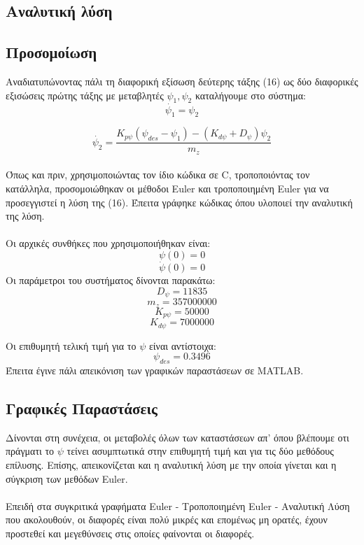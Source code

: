 \documentclass{article}
\begin{document}
\subsection{Αναλυτική λύση}
\subsection{Προσομοίωση}
Αναδιατυπώνοντας πάλι τη διαφορική εξίσωση δεύτερης τάξης (16) ως δύο διαφορικές εξισώσεις πρώτης τάξης με μεταβλητές \(\psi_1, \psi_2\) καταλήγουμε στο σύστημα:
\begin{equation}
\dot{\psi_1} = \psi_2
\end{equation}

\begin{equation}
\dot{\psi_2} = \frac{K_{p\psi}(\psi_{des} - \psi_1) - (K_{d\psi} + D_\psi)\psi_2}{m_z}
\end{equation}
\\
Όπως και πριν, χρησιμοποιώντας τον ίδιο κώδικα σε C, τροποποιόντας τον κατάλληλα, προσομοιώθηκαν οι μέθοδοι Euler και τροποποιημένη Euler για να προσεγγιστεί η λύση της (16). Έπειτα γράφηκε κώδικας όπου υλοποιεί την αναλυτική της λύση.   
\\\\Oι αρχικές συνθήκες που χρησιμοποιήθηκαν είναι:
\[\psi(0) = 0\]
\[\dot{\psi}(0) = 0\]
Οι παράμετροι του συστήματος δίνονται παρακάτω:
\[D_\psi = 11835\]
\[m_z = 357000000\]
\[K_{p\psi} = 50000\]
\[K_{d\psi} = 7000000\]

Οι επιθυμητή τελική τιμή για το \(\psi\) είναι αντίστοιχα: 
\[\psi_{des} = 0.3496\]
Έπειτα έγινε πάλι απεικόνιση των γραφικών παραστάσεων σε MATLAB.
\subsection{Γραφικές Παραστάσεις}
Δίνονται στη συνέχεια, οι μεταβολές όλων των καταστάσεων απ' όπου βλέπουμε οτι πράγματι το \(\psi\) τείνει ασυμπτωτικά στην επιθυμητή τιμή και για τις δύο μεθόδους επίλυσης. Επίσης, απεικονίζεται και η αναλυτική λύση με την οποία γίνεται και η σύγκριση των μεθόδων Euler. 
\\\\
Επειδή στα συγκριτικά γραφήματα Euler - Tροποποιημένη Euler - Αναλυτική Λύση που ακολουθούν, οι διαφορές είναι πολύ μικρές και επομένως μη ορατές, έχουν προστεθεί και μεγεθύνσεις στις οποίες φαίνονται οι διαφορές.
\end{document}
